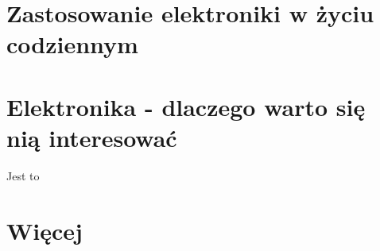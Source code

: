 \section {Zastosowanie elektroniki w życiu codziennym }
\section{Elektronika - dlaczego warto się nią interesować}
Jest to 
\section {Więcej}
~\\
%





